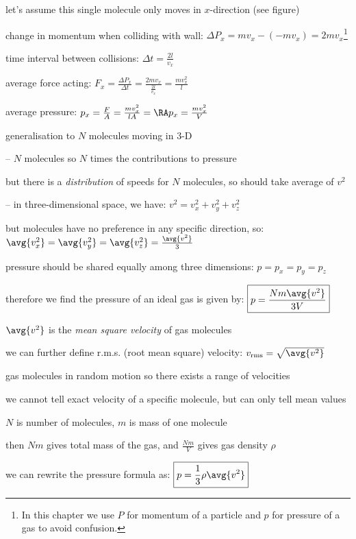 let's assume this single molecule only moves in $x$-direction (see figure)

change in momentum when colliding with wall: $\Delta P_x = mv_x - (-mv_x) = 2mv_x$\footnote{In this chapter we use $P$ for momentum of a particle and $p$ for pressure of a gas to avoid confusion.}

time interval between collisions: $\Delta t=\frac{2l}{v_x}$

average force acting: $F_x=\frac{\Delta P_x}{\Delta t} = \frac{2mv_x}{\tfrac{2l}{v_x}} = \frac{mv_x^2}{l}$

average pressure: $p_x=\frac{F}{A} = \frac{mv_x^2}{lA} = \RA p_x = \frac{mv_x^2}{V}$

generalisation to $N$ molecules moving in 3-D

\begin{compactitem}
	\item[--] $N$ molecules so $N$ times the contributions to pressure
	
	but there is a \emph{distribution} of speeds for $N$ molecules, so should take average of $v^2$
	
	\item[--] in three-dimensional space, we have: $v^2=v_x^2 + v_y^2 + v_z^2$
	
	but molecules have no preference in any specific direction, so: $\avg{v_x^2} = \avg{v_y^2} = \avg{v_z^2} = \frac{\avg{v^2}}{3}$
	
	pressure should be shared equally among three dimensions: $p=p_x=p_y=p_z$
		
\end{compactitem}


therefore we find the pressure of an ideal gas is given by: $\boxed{p = \frac{Nm\avg{v^2}}{3V}}$

\cmt $\avg{v^2}$ is the \emph{mean square velocity} of gas molecules

we can further define r.m.s. (root mean square) velocity: $v_\text{rms} = \sqrt{\avg{v^2}}$ 

gas molecules in random motion so there exists a range of velocities

we cannot tell exact velocity of a specific molecule, but can only tell mean values

\cmt $N$ is number of molecules, $m$ is mass of one molecule

then $Nm$ gives total mass of the gas, and $\frac{Nm}{V}$ gives gas density $\rho$

we can rewrite the pressure formula as: $\boxed{p=\frac{1}{3}\rho \avg{v^2}}$ 

